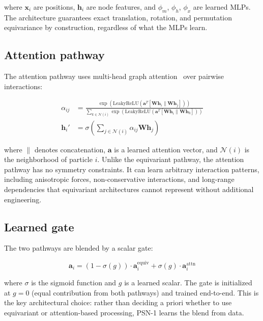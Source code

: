 \documentclass[10pt,twocolumn]{article}
\begin{document}
where $\mathbf{x}_i$ are positions, $\mathbf{h}_i$ are node features, and $\phi_m$, $\phi_h$, $\phi_x$ are learned MLPs. The architecture guarantees exact translation, rotation, and permutation equivariance by construction, regardless of what the MLPs learn.

\subsection{Attention pathway}

The attention pathway uses multi-head graph attention~\cite{velickovic2018} over pairwise interactions:

\begin{align}
    \alpha_{ij} &= \frac{\exp(\text{LeakyReLU}(\mathbf{a}^T [\mathbf{W}\mathbf{h}_i \| \mathbf{W}\mathbf{h}_j]))}{\sum_{k \in \mathcal{N}(i)} \exp(\text{LeakyReLU}(\mathbf{a}^T [\mathbf{W}\mathbf{h}_i \| \mathbf{W}\mathbf{h}_k]))} \\
    \mathbf{h}_i' &= \sigma\left(\sum_{j \in \mathcal{N}(i)} \alpha_{ij} \mathbf{W}\mathbf{h}_j\right)
\end{align}

where $\|$ denotes concatenation, $\mathbf{a}$ is a learned attention vector, and $\mathcal{N}(i)$ is the neighborhood of particle $i$. Unlike the equivariant pathway, the attention pathway has no symmetry constraints. It can learn arbitrary interaction patterns, including anisotropic forces, non-conservative interactions, and long-range dependencies that equivariant architectures cannot represent without additional engineering.

\subsection{Learned gate}

The two pathways are blended by a scalar gate:

\begin{equation}
    \mathbf{a}_i = (1 - \sigma(g)) \cdot \mathbf{a}_i^{\text{equiv}} + \sigma(g) \cdot \mathbf{a}_i^{\text{attn}}
\end{equation}

where $\sigma$ is the sigmoid function and $g$ is a learned scalar. The gate is initialized at $g = 0$ (equal contribution from both pathways) and trained end-to-end. This is the key architectural choice: rather than deciding a priori whether to use equivariant or attention-based processing, PSN-1 learns the blend from data.
\end{document}
